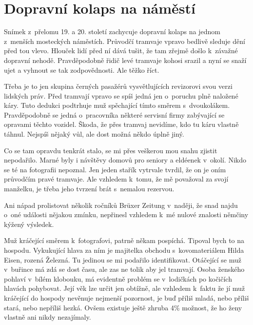 
\chapter{Dopravní kolaps na náměstí}

Snímek z~přelomu 19. a 20. století zachycuje dopravní kolaps na jednom
z~menších mosteckých náměstích. Průvodčí tramvaje vpravo bedlivě sleduje dění
před tou vlevo. Hlouček lidí před ní dává tušit, že tam zřejmě došlo k~závažné
dopravní nehodě. Pravděpodobně řidič levé tramvaje kohosi srazil a nyní se
snaží ujet a vyhnout se tak zodpovědnosti. Ale těžko říct.

Třeba je to jen skupina černých pasažérů vysvětlujících revizorovi svou verzi
lidských práv. Před tramvají vpravo se spíš jedná jen o~poruchu plně naložené
káry. Tuto dedukci podtrhuje muž spěchající tímto směrem s~dvoukolákem.
Pravděpodobně se jedná o~pracovníka některé servisní firmy zabývající se
opravami těchto vozidel. Škoda, že přes tramvaj nevidíme, kdo tu káru vlastně
táhnul. Nejspíš nějaký vůl, ale dost možná někdo úplně jiný.

Co se tam opravdu tenkrát stalo, se mi přes veškerou mou snahu zjistit
nepodařilo. Marné byly i návštěvy domovů pro seniory a eldéenek v~okolí. Nikdo
se té na fotografii nepoznal. Jen jeden stařík vytrvale tvrdil, že on je oním
průvodčím pravé tramvaje. Ale vzhledem k~tomu, že mě považoval za svojí
manželku, je třeba jeho tvrzení brát s~nemalou rezervou.

Ani nápad prolistovat několik ročníků Brüxer Zeitung v~naději, že snad najdu
o~oné události nějakou zmínku, nepřinesl vzhledem k~mé nulové znalosti němčiny
kýžený výsledek.

Muž kráčející směrem k~fotografovi, patrně někam pospíchá. Tipoval bych to na
hospodu. Vykukující hlava za ním je majitelka obchodu s~kovomateriálem Hilda
Eisen, rozená Železná. Tu jedinou se mi podařilo identifikovat. Otáčející se
muž v~buřince má zdá se dost času, ale zas ne tolik aby jel tramvají. Osoba
ženského pohlaví v~bílém klobouku, má evidentně problém se v~lodičkách po
kočičích hlavách pohybovat. Její věk lze určit jen obtížně, ale vzhledem
k~faktu že jí muž kráčející do hospody nevěnuje nejmenší pozornost, je buď
příliš mladá, nebo příliš stará, nebo nepříliš hezká. Ovšem existuje ještě
zhruba 4\% možnost, že ho ženy vlastně ani nikdy nezajímaly.


